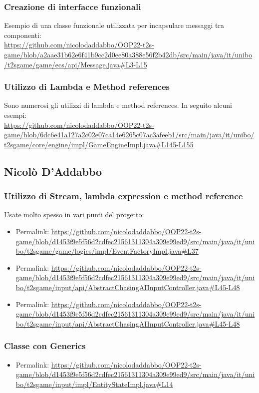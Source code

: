 \documentclass[a4paper,12pt]{report}
\begin{document}
\subsubsection*{Creazione di interfacce funzionali}
Esempio di una classe funzionale utilizzata per incapsulare messaggi tra componenti:
\\
\url{https://github.com/nicolodaddabbo/OOP22-t2s-game/blob/a2aae31b62e6f41b9cc2d0ee80a388e56f2b42db/src/main/java/it/unibo/t2sgame/game/ecs/api/Message.java#L3-L15}
\subsubsection*{Utilizzo di Lambda e Method references}
Sono numerosi gli utilizzi di lambda e method references. In seguito alcuni esempi: 
\\
\url{https://github.com/nicolodaddabbo/OOP22-t2s-game/blob/6dc6e41a127a2c02e07ca14e6265c07ac3afeeb1/src/main/java/it/unibo/t2sgame/core/engine/impl/GameEngineImpl.java#L145-L155}


\subsection*{Nicolò D'Addabbo}
\subsubsection*{Utilizzo di Stream, lambda expression e method reference}
Usate molto spesso in vari punti del progetto:
\begin{itemize}
	\item Permalink: \url{https://github.com/nicolodaddabbo/OOP22-t2s-game/blob/d1453f9e5f56d2cdfec21561311304a309e99ed9/src/main/java/it/unibo/t2sgame/game/logics/impl/EventFactoryImpl.java#L37}
	\item Permalink: \url{https://github.com/nicolodaddabbo/OOP22-t2s-game/blob/d1453f9e5f56d2cdfec21561311304a309e99ed9/src/main/java/it/unibo/t2sgame/input/api/AbstractChasingAIInputController.java#L45-L48}
	\item Permalink: \url{https://github.com/nicolodaddabbo/OOP22-t2s-game/blob/d1453f9e5f56d2cdfec21561311304a309e99ed9/src/main/java/it/unibo/t2sgame/input/api/AbstractChasingAIInputController.java#L45-L48}
\end{itemize}
\subsubsection*{Classe con Generics}
\begin{itemize}
	\item Permalink: \url{https://github.com/nicolodaddabbo/OOP22-t2s-game/blob/d1453f9e5f56d2cdfec21561311304a309e99ed9/src/main/java/it/unibo/t2sgame/input/impl/EntityStateImpl.java#L14}
\end{itemize}
\end{document}
